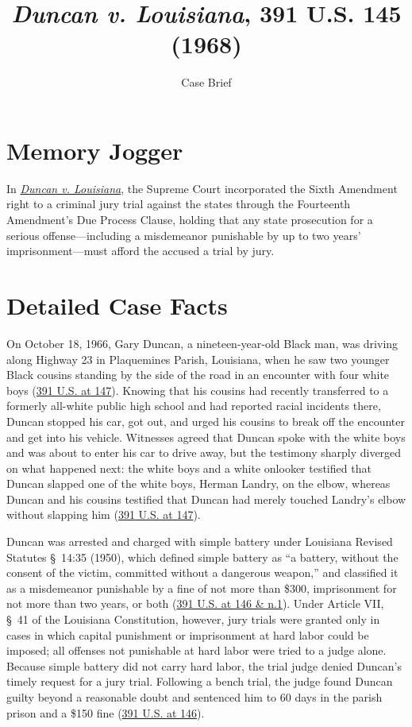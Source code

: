 \documentclass[12pt]{article}
\title{\textit{Duncan v. Louisiana}, 391 U.S. 145 (1968)}
\subtitle{Case Brief}
\author{}
\date{}
\begin{document}
\maketitle

\section{Memory Jogger}

In \href{https://www.courtlistener.com/opinion/107685/duncan-v-louisiana/}{\textit{Duncan v. Louisiana}}, the Supreme Court incorporated the Sixth Amendment right to a criminal jury trial against the states through the Fourteenth Amendment's Due Process Clause, holding that any state prosecution for a serious offense---including a misdemeanor punishable by up to two years' imprisonment---must afford the accused a trial by jury.

\section{Detailed Case Facts}

On October 18, 1966, Gary Duncan, a nineteen-year-old Black man, was driving along Highway 23 in Plaquemines Parish, Louisiana, when he saw two younger Black cousins standing by the side of the road in an encounter with four white boys (\href{https://supreme.justia.com/cases/federal/us/391/145/}{391 U.S. at 147}). Knowing that his cousins had recently transferred to a formerly all-white public high school and had reported racial incidents there, Duncan stopped his car, got out, and urged his cousins to break off the encounter and get into his vehicle. Witnesses agreed that Duncan spoke with the white boys and was about to enter his car to drive away, but the testimony sharply diverged on what happened next: the white boys and a white onlooker testified that Duncan slapped one of the white boys, Herman Landry, on the elbow, whereas Duncan and his cousins testified that Duncan had merely touched Landry's elbow without slapping him (\href{https://caselaw.findlaw.com/court/us-supreme-court/391/145.html}{391 U.S. at 147}).

Duncan was arrested and charged with simple battery under Louisiana Revised Statutes \S~14:35 (1950), which defined simple battery as ``a battery, without the consent of the victim, committed without a dangerous weapon,'' and classified it as a misdemeanor punishable by a fine of not more than \$300, imprisonment for not more than two years, or both (\href{https://supreme.justia.com/cases/federal/us/391/145/}{391 U.S. at 146 \& n.1}). Under Article VII, \S~41 of the Louisiana Constitution, however, jury trials were granted only in cases in which capital punishment or imprisonment at hard labor could be imposed; all offenses not punishable at hard labor were tried to a judge alone. Because simple battery did not carry hard labor, the trial judge denied Duncan's timely request for a jury trial. Following a bench trial, the judge found Duncan guilty beyond a reasonable doubt and sentenced him to 60 days in the parish prison and a \$150 fine (\href{https://caselaw.findlaw.com/court/us-supreme-court/391/145.html}{391 U.S. at 146}).
\end{document}
